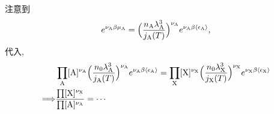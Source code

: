 \begin{itemize}
	\begin{tcolorbox}[title=calculation:]
		注意到
		\begin{equation}
			e^{\nu_\text{A} \beta \mu_\text{A}} = \Big( \frac{n_\text{A} \lambda_\text{A}^3}{j_\text{A}(T)} \Big)^{\nu_\text{A}} e^{\nu_\text{A} \beta \braket{\epsilon_\text{A}}},
		\end{equation}
		代入,
		\begin{align}
			& \prod_\text{A} [\text{A}]^{\nu_\text{A}} \Big( \frac{n_0 \lambda_\text{A}^3}{j_\text{A}(T)} \Big)^{\nu_\text{A}} e^{\nu_\text{A} \beta \braket{\epsilon_\text{A}}} = \prod_\text{X} [\text{X}]^{\nu_\text{X}} \Big( \frac{n_0 \lambda_\text{X}^3}{j_\text{X}(T)} \Big)^{\nu_\text{X}} e^{\nu_\text{X} \beta \braket{\epsilon_\text{X}}} \notag \\
			\Longrightarrow & \frac{\prod [\text{X}]^{\nu_\text{X}}}{\prod [\text{A}]^{\nu_\text{A}}} = \cdots
		\end{align}
	\end{tcolorbox}
\end{itemize}
